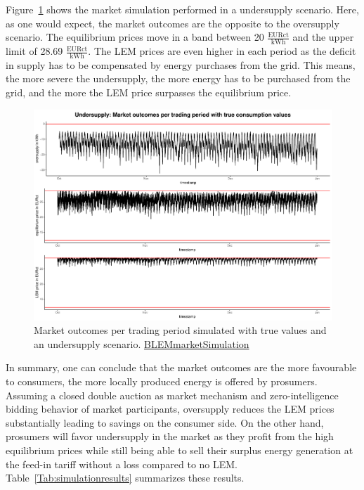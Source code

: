 Figure~\ref{Fig:marketoutcomes_true_under} shows the market simulation performed in a undersupply scenario. Here, as one would expect, the market outcomes are the opposite to the oversupply scenario. The equilibrium prices move in a band between 20 $\frac{\text{EURct}}{\text{kWh}}$ and the upper limit of 28.69 $\frac{\text{EURct}}{\text{kWh}}$. The LEM prices are even higher in each period as the deficit in supply has to be compensated by energy purchases from the grid. This means, the more severe the undersupply, the more energy has to be purchased from the grid, and the more the LEM price surpasses the equilibrium price.
%
\begin{figure}[htp]
    \centering
    \includegraphics[width=\textwidth-1.1cm]{thesis/graphs/marketsimulation/marketoutcome_true_undersupply.pdf}
    \caption[Market outcomes simulated with undersupply and true values]{Market outcomes per trading period simulated with true values and an undersupply scenario. \quantnet\href{https://github.com/QuantLet/BLEM/tree/master/BLEMmarketSimulation}{BLEMmarketSimulation}}
    \label{Fig:marketoutcomes_true_under}
\end{figure}
%
\newpage
In summary, one can conclude that the market outcomes are the more favourable to consumers, the more locally produced energy is offered by prosumers. Assuming a closed double auction as market mechanism and zero-intelligence bidding behavior of market participants, oversupply reduces the LEM prices substantially leading to savings on the consumer side. On the other hand, prosumers will favor undersupply in the market as they profit from the high equilibrium prices while still being able to sell their surplus energy generation at the feed-in tariff without a loss compared to no LEM. Table~\ref{Tab:simulationresults} summarizes these results.


